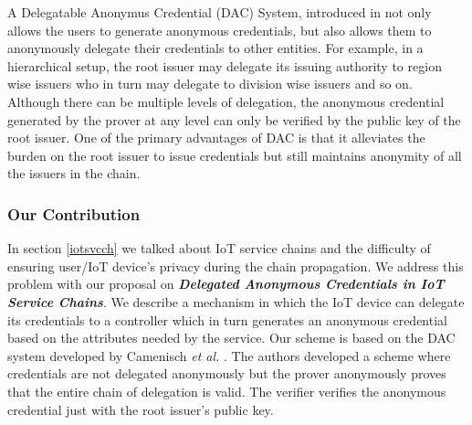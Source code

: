 \documentclass[journal]{IEEEtran}
\begin{document}
A Delegatable Anonymus Credential (DAC) System, introduced in \cite{delegatabledac}  not only allows the users to generate anonymous credentials, but also allows them to anonymously delegate their credentials to other entities. For example, in a hierarchical setup, the root issuer may delegate its issuing authority to region wise issuers who in turn may delegate to division wise issuers and so on. Although there can be multiple levels of delegation, the anonymous credential generated by the prover at any level can only be verified by the public key of the root issuer.  One of the primary advantages of DAC is that it alleviates the burden on the root issuer to issue credentials but still maintains anonymity of all the issuers in the chain.

\subsubsection{Our Contribution}
In section \ref{iotsvcch} we talked about IoT service chains and the difficulty of ensuring user/IoT device's privacy during the chain propagation. We address this problem with our proposal on \textbf{\textit{Delegated Anonymous Credentials in IoT Service Chains}}. We describe a mechanism in which the IoT device can delegate its credentials to a controller which in turn generates an anonymous credential based on the attributes needed by the service. Our scheme is based on the DAC system developed by Camenisch \textit{et al.} \cite{CamenischDD17}. The authors developed a scheme where credentials are not delegated anonymously but the prover anonymously proves that the entire chain of delegation is valid. The verifier verifies the anonymous credential just with the root issuer's public key.
\end{document}
